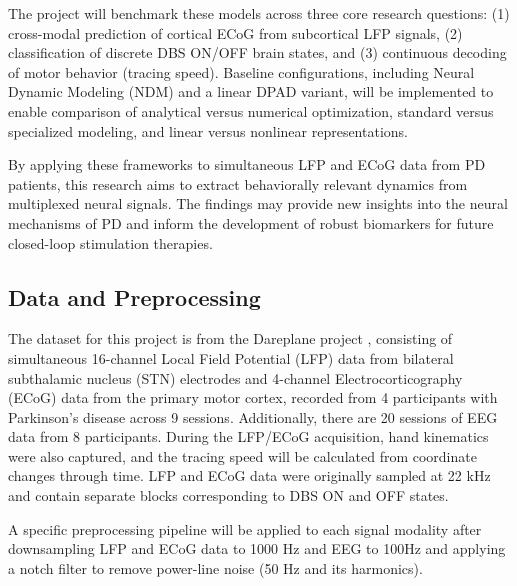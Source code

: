 \documentclass[12pt, a4paper]{article}
\begin{document}
The project will benchmark these models across three core research questions: (1) cross-modal prediction of cortical ECoG from subcortical LFP signals, (2) classification of discrete DBS ON/OFF brain states, and (3) continuous decoding of motor behavior (tracing speed). Baseline configurations, including Neural Dynamic Modeling (NDM) and a linear DPAD variant, will be implemented to enable comparison of analytical versus numerical optimization, standard versus specialized modeling, and linear versus nonlinear representations.

By applying these frameworks to simultaneous LFP and ECoG data from PD patients, this research aims to extract behaviorally relevant dynamics from multiplexed neural signals. The findings may provide new insights into the neural mechanisms of PD and inform the development of robust biomarkers for future closed-loop stimulation therapies.

\subsection{Data and Preprocessing}
The dataset for this project is from the Dareplane project \parencite{doldLFPECoGData2024}, consisting of simultaneous 16-channel Local Field Potential (LFP) data from bilateral subthalamic nucleus (STN) electrodes and 4-channel Electrocorticography (ECoG) data from the primary motor cortex, recorded from 4 participants with Parkinson's disease across 9 sessions. Additionally, there are 20 sessions of EEG data from 8 participants. During the LFP/ECoG acquisition, hand kinematics were also captured, and the tracing speed will be calculated from coordinate changes through time. LFP and ECoG data were originally sampled at 22 kHz and contain separate blocks corresponding to DBS ON and OFF states.

A specific preprocessing pipeline will be applied to each signal modality after downsampling LFP and ECoG data to 1000 Hz and EEG to 100Hz and applying a notch filter to remove power-line noise (50 Hz and its harmonics).
\end{document}
